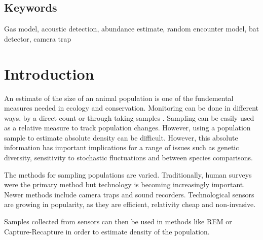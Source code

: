 \documentclass[a4paper,10pt,reqno,oneside]{amsart}
\begin{document}
\subsection{Keywords}
Gas model, acoustic detection, abundance estimate, random encounter model, bat detector, camera trap

\section{Introduction}

An estimate of the size of an animal population is one of the fundemental measures needed in ecology and conservation. Monitoring can be done in different ways, by a direct count or through taking samples \citep{pollock2002large}. Sampling can be easily used as a relative measure to track population changes. However, using a population sample to estimate absolute density can be difficult. However, this absolute information has important implications for a range of issues such as genetic diversity, sensitivity to stochastic fluctuations and between species comparisons.

The methods for sampling populations are varied. Traditionally, human surveys were the primary method but technology is becoming increasingly important. Newer methods include camera traps and sound recorders. Technological sensors are growing in popularity, as they are efficient, relativity cheap and non-invasive. \citep{gese2001monitoring}

Samples collected from sensors can then be used in methods like REM or Capture-Recapture in order to estimate density of the population.
\end{document}
